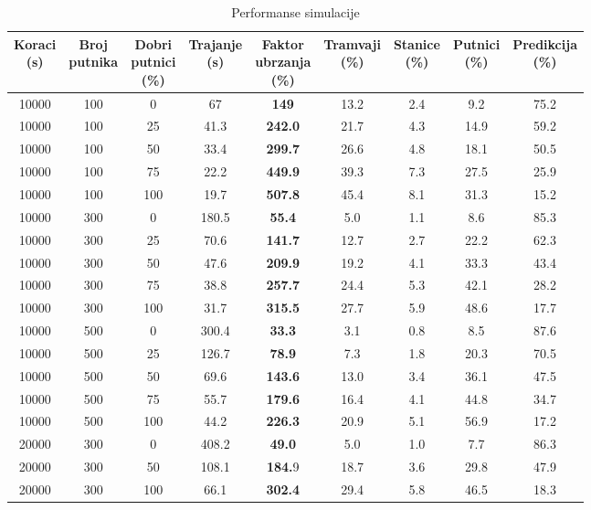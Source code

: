 \documentclass[times, utf8, diplomski]{fer}
\begin{document}
\begin{table}[htbp]
    \caption{Performanse simulacije}
    \label{tbl:simulacija}
    \centering
    \small
    \setlength\tabcolsep{2pt}
    \begin{tabular}{ccc|cccccc} \hline
    \thead{Koraci\\ (s)} & \thead{Broj\\ putnika} & \thead{Dobri\\ putnici \\ (\%)} & \thead{Trajanje\\ (s)} & \thead{Faktor\\ ubrzanja \\ (\%)} & \thead{Tramvaji\\ (\%)} & \thead{Stanice\\ (\%)} & \thead{Putnici\\ (\%)} & \thead{Predikcija\\ (\%)}\\ \hline
    10000 & 100 & 0 & 67 & \textbf{149} & 13.2 & 2.4 & 9.2 & 75.2 \\
    10000 & 100 & 25 & 41.3 & \textbf{242.0} & 21.7 & 4.3 & 14.9 & 59.2 \\
    10000 & 100 & 50 & 33.4 & \textbf{299.7} & 26.6 & 4.8 & 18.1 & 50.5 \\
    10000 & 100 & 75 & 22.2 & \textbf{449.9} & 39.3 & 7.3 & 27.5 & 25.9 \\
    10000 & 100 & 100 & 19.7 & \textbf{507.8} & 45.4 & 8.1 & 31.3 & 15.2 \\
    10000 & 300 & 0 & 180.5 & \textbf{55.4} & 5.0 & 1.1 & 8.6 & 85.3 \\
    10000 & 300 & 25 & 70.6 & \textbf{141.7} & 12.7 & 2.7 & 22.2 & 62.3 \\
    10000 & 300 & 50 & 47.6 & \textbf{209.9} & 19.2 & 4.1 & 33.3 & 43.4 \\
    10000 & 300 & 75 & 38.8 & \textbf{257.7} & 24.4 & 5.3 & 42.1 & 28.2 \\
    10000 & 300 & 100 & 31.7 & \textbf{315.5} & 27.7 & 5.9 & 48.6 & 17.7 \\
    10000 & 500 & 0 & 300.4 & \textbf{33.3} & 3.1 & 0.8 & 8.5 & 87.6 \\
    10000 & 500 & 25 & 126.7 & \textbf{78.9} & 7.3 & 1.8 & 20.3 & 70.5 \\
    10000 & 500 & 50 & 69.6 & \textbf{143.6} & 13.0 & 3.4 & 36.1 & 47.5 \\
    10000 & 500 & 75 & 55.7 & \textbf{179.6} & 16.4 & 4.1 & 44.8 & 34.7 \\
    10000 & 500 & 100 & 44.2 & \textbf{226.3} & 20.9 & 5.1 & 56.9 & 17.2 \\
    20000 & 300 & 0 & 408.2 & \textbf{49.0} & 5.0 & 1.0 & 7.7 & 86.3 \\
    20000 & 300 & 50 & 108.1 & \textbf{184.}9 & 18.7 & 3.6 & 29.8 & 47.9 \\
    20000 & 300 & 100 & 66.1 & \textbf{302.4} & 29.4 & 5.8 & 46.5 & 18.3 \\ \hline
    \end{tabular}
\end{table}
\end{document}
